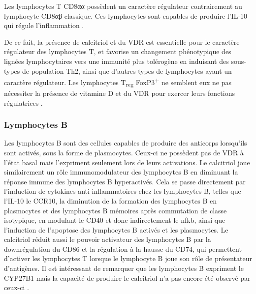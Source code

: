 \documentclass[
  a4paper,
  DIV=11,
  numbers=noendperiod,
  listof=totoc]{scrreprt}
\begin{document}
Les lymphocytes T CD8αα possèdent un caractère régulateur contrairement
au lymphocyte CD8αβ classique. Ces lymphocytes sont capables de produire
l'\ac{IL-10} qui régule l'inflammation \autocite{Cantorna.2010}.

De ce fait, la présence de calcitriol et du \ac{VDR} est essentielle
pour le caractère régulateur des lymphocytes T, et favorise un
changement phénotypique des lignées lymphocytaires vers une immunité
plus tolérogène en induisant des sous-types de population Th2, ainsi que
d'autres types de lymphocytes ayant un caractère régulateur. Les
lymphocytes T\textsubscript{reg} FoxP3\textsuperscript{+} ne semblent
eux ne pas nécessiter la présence de vitamine D et du \ac{VDR} pour
exercer leurs fonctions régulatrices \autocite{Cantorna.2010}.

\subsubsection{Lymphocytes B}\label{lymphocytes-b}

Les lymphocytes B sont des cellules capables de produire des anticorps
lorsqu'ils sont activés, sous la forme de plasmocytes. Ceux-ci ne
possèdent pas de VDR à l'état basal mais l'expriment seulement lors de
leurs activations. Le calcitriol joue similairement un rôle
immunomodulateur des lymphocytes B en diminuant la réponse immune des
lymphocytes B hyperactivés. Cela se passe directement par l'induction de
cytokines anti-inflammatoires chez les lymphocytes B, telles que
l'\ac{IL-10} le \ac{CCR10}, la diminution de la formation des
lymphocytes B en plasmocytes et des lymphocytes B mémoires après
commutation de classe isotypique, en modulant le CD40 et donc
indirectement le \ac{nfkb}, ainsi que l'induction de l'apoptose des
lymphocytes B activés et les plasmocytes. Le calcitriol réduit aussi le
pouvoir activateur des lymphocytes B par la downrégulation du CD86 et la
régulation à la hausse du CD74, qui permettent d'activer les lymphocytes
T lorsque le lymphocyte B joue son rôle de présentateur d'antigènes. Il
est intéressant de remarquer que les lymphocytes B expriment le
\ac{CYP27B1} mais la capacité de produire le calcitriol n'a pas encore
été observé par ceux-ci \autocite{Meza-Meza.2022,Martens.2020}.
\end{document}
